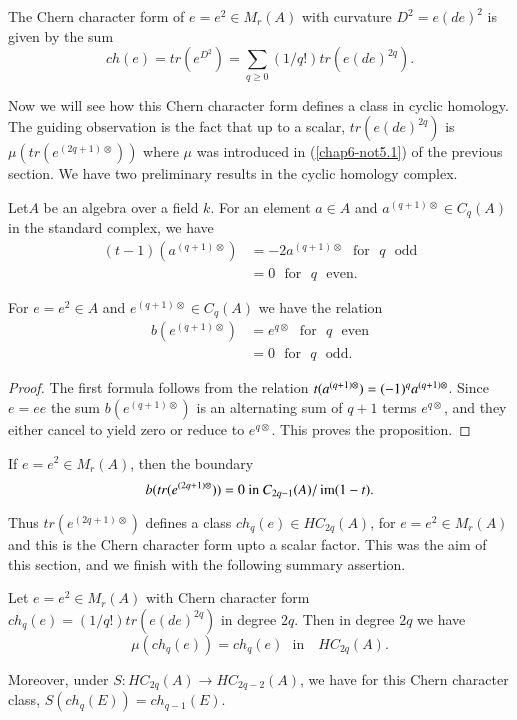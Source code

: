 \begin{definition}\label{chap6-defi6.4}
The Chern character form of $e=e^{2}\in M_{r}(A)$ with curvature
$D^{2}=e(de)^{2}$ is given by the sum
$$
ch(e)=tr(e^{D^{2}})=\sum_{q\geq 0}(1/q!)tr(e(de)^{2q}).
$$

Now we will see how this Chern character form defines a class in
cyclic homology. The guiding observation is the fact that up to a
scalar, $tr(e(de)^{2q})$ is $\mu(tr(e^{(2q+1)\otimes}))$ where $\mu$
was introduced in (\ref{chap6-not5.1}) of the previous section. We
have two preliminary results in the cyclic homology complex.
\end{definition}

\begin{proposition}\label{chap6-prop6.5}
Let\pageoriginale $A$ be an algebra over a field $k$. For an element $a\in A$ and
$a^{(q+1)\otimes}\in C_{q}(A)$ in the standard complex, we have
\begin{align*}
(t-1)(a^{(q+1)\otimes}) &= -2a^{(q+1)\otimes}\text{~ for~ } q\text{~
    odd}\\
&= 0\text{~ for~ } q\text{~ even.}
\end{align*}

For $e=e^{2}\in A$ and $e^{(q+1)\otimes}\in C_{q}(A)$ we have the
relation
\begin{align*}
b(e^{(q+1)\otimes}) &= e^{q\otimes}\text{~ for~ }q \text{~ even}\\
&=0\text{~ for~ }q\text{~ odd.}
\end{align*}
\end{proposition}

\begin{proof}
The first formula follows from the relation
$t(a^{(q+1)\otimes})=(-1)^{q}\break a^{(q+1)\otimes}$. Since $e=ee$ the sum
$b(e^{(q+1)\otimes})$ is an alternating sum of $q+1$ terms
$e^{q\otimes}$, and they either cancel to yield zero or reduce to
$e^{q\otimes}$. This proves the proposition.
\end{proof}

\begin{corollary}\label{chap6-coro6.6}
If $e=e^{2}\in M_{r}(A)$, then the boundary
$$
b(tr(e^{(2q+1)\otimes}))=0\text{~ in~ } C_{2q-1}(A)/\operatorname{im}(1-t).
$$

Thus $tr(e^{(2q+1)\otimes})$ defines a class $ch_{q}(e)\in
HC_{2q}(A)$, for $e=e^{2}\in M_{r}(A)$ and this is the Chern character
form upto a scalar factor. This was the aim of this section, and we
finish with the following summary assertion.
\end{corollary}

\begin{theorem}\label{chap6-thm6.7}
Let $e=e^{2}\in M_{r}(A)$ with Chern character form
$ch_{q}(e)=(1/q!)tr(e(de)^{2q})$ in degree $2q$. Then in degree $2q$
we have
$$
\mu(ch_{q}(e))=ch_{q}(e)\text{~ in ~ } HC_{2q}(A).
$$

Moreover, under $S:HC_{2q}(A)\to HC_{2q-2}(A)$, we have for this Chern
character class, $S(ch_{q}(E))=ch_{q-1}(E)$.
\end{theorem}




